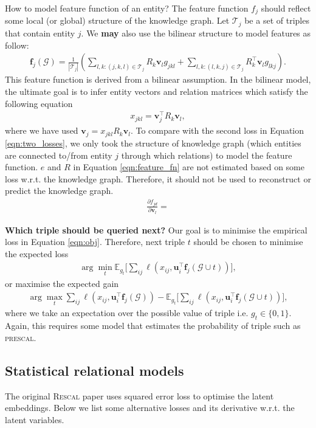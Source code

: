 \documentclass{article} %
\theoremstyle{definition}
\newcommand\bs{\boldsymbol}
\begin{document}
How to model feature function of an entity? The feature function $f_j$ should reflect some local (or global) structure of the knowledge graph.  Let $\mathcal{T}_j$ be a set of triples that contain entity $j$. We \textbf{may} also use the bilinear structure to model features as follow:
\begin{align}
\label{eqn:feature_fn}
\bs{f}_j(\mathcal{G}) = \frac{1}{|\mathcal{T}_j|} ( \sum_{l,k:(j,k,l) \in \mathcal{T}_j} R_k \bs{v}_{l} g_{jkl} + \sum_{l,k:(l,k,j) \in \mathcal{T}_j}R_k^\top \bs{v}_{l} g_{lkj} ).
\end{align}
This feature function is derived from a bilinear assumption. In the bilinear model, the ultimate goal is to infer entity vectors and relation matrices which satisfy the following equation
\begin{align}
x_{jkl} = \bs{v}_j ^\top R_k \bs{v}_l,
\end{align}
where we have used $\bs{v}_j = x_{jkl} R_k \bs{v}_l$.
To compare with the second loss in Equation \ref{eqn:two_losses}, we only took the structure of knowledge graph (which entities are connected to/from entity $j$ through which relations) to model the feature function. $e$ and $R$ in Equation \ref{eqn:feature_fn} are not estimated based on some loss w.r.t. the knowledge graph. Therefore, it should not be used to reconstruct or predict the knowledge graph.
\begin{align}
\frac{\partial f_{jd}}{\partial\bs{v}_l} = 
\end{align}

\textbf{Which triple should be queried next?} Our goal is to minimise the empirical loss in Equation \ref{eqn:obj}. Therefore, next triple $t$ should be chosen to minimise the expected loss
\begin{align}
\arg\min_t \mathbb{E}_{g_t}\bigg[\sum_{ij}\ell(x_{ij}, \bs{u}_{i}^\top  \bs{f}_j(\mathcal{G} \cup t))\bigg],
\end{align}
or maximise the expected gain
\begin{align}
\arg\max_t \sum_{ij}\ell(x_{ij}, \bs{u}_{i}^\top  \bs{f}_j(\mathcal{G})) - \mathbb{E}_{g_t}\bigg[\sum_{ij}\ell(x_{ij}, \bs{u}_{i}^\top  \bs{f}_j(\mathcal{G} \cup t))\bigg],
\end{align}
where we take an expectation over the possible value of triple i.e. $g_t \in \{0, 1\}$. Again, this requires some model that estimates the probability of triple such as \textsc{prescal}.

\subsection{Statistical relational models}
The original \textsc{Rescal} paper uses squared error loss to optimise the latent embeddings. Below we list some alternative losses and its derivative w.r.t. the latent variables.
\end{document}
